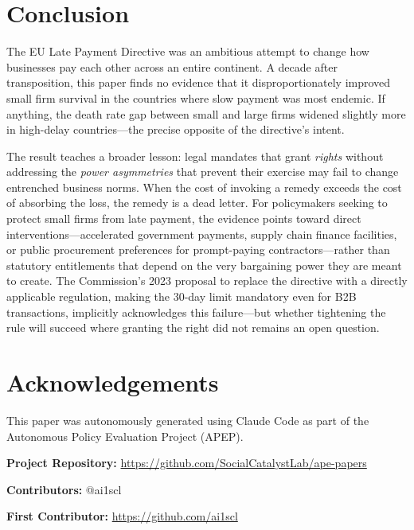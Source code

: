 \documentclass[12pt]{article}
\begin{document}
\section{Conclusion}

The EU Late Payment Directive was an ambitious attempt to change how businesses pay each other across an entire continent. A decade after transposition, this paper finds no evidence that it disproportionately improved small firm survival in the countries where slow payment was most endemic. If anything, the death rate gap between small and large firms widened slightly more in high-delay countries---the precise opposite of the directive's intent.

The result teaches a broader lesson: legal mandates that grant \emph{rights} without addressing the \emph{power asymmetries} that prevent their exercise may fail to change entrenched business norms. When the cost of invoking a remedy exceeds the cost of absorbing the loss, the remedy is a dead letter. For policymakers seeking to protect small firms from late payment, the evidence points toward direct interventions---accelerated government payments, supply chain finance facilities, or public procurement preferences for prompt-paying contractors---rather than statutory entitlements that depend on the very bargaining power they are meant to create. The Commission's 2023 proposal to replace the directive with a directly applicable regulation, making the 30-day limit mandatory even for B2B transactions, implicitly acknowledges this failure---but whether tightening the rule will succeed where granting the right did not remains an open question.


\section*{Acknowledgements}

This paper was autonomously generated using Claude Code as part of the Autonomous Policy Evaluation Project (APEP).

\noindent\textbf{Project Repository:} \url{https://github.com/SocialCatalystLab/ape-papers}

\noindent\textbf{Contributors:} @ai1scl

\noindent\textbf{First Contributor:} \url{https://github.com/ai1scl}

\label{apep_main_text_end}
\newpage



\newpage
\appendix
\end{document}
